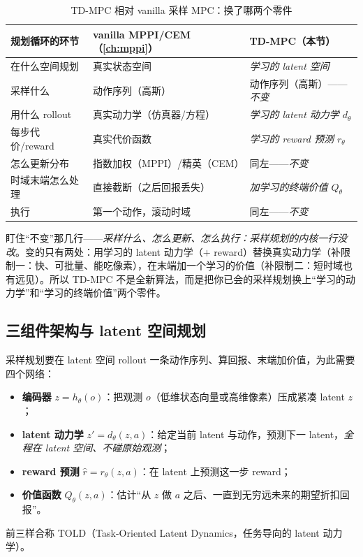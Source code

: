 \begin{table}[H]\centering\small
\caption{TD-MPC 相对 vanilla 采样 MPC：换了哪两个零件}
\label{tab:mv-twoparts}
\begin{tabular}{p{} p{} p{}}
\toprule
规划循环的环节 & vanilla MPPI/CEM（\cref{ch:mppi}） & TD-MPC（本节） \\
\midrule
在什么空间规划 & 真实状态空间 & \emph{学习的 latent 空间} \\
采样什么 & 动作序列（高斯） & 动作序列（高斯）——\emph{不变} \\
用什么 rollout & 真实动力学（仿真器/方程） & \emph{学习的 latent 动力学 $d_\theta$} \\
每步代价/reward & 真实代价函数 & \emph{学习的 reward 预测 $r_\theta$} \\
怎么更新分布 & 指数加权（MPPI）/精英（CEM） & 同左——\emph{不变} \\
时域末端怎么处理 & 直接截断（之后回报丢失） & \emph{加学习的终端价值 $Q_\theta$} \\
执行 & 第一个动作，滚动时域 & 同左——\emph{不变} \\
\bottomrule
\end{tabular}
\end{table}

\noindent 盯住“不变”那几行——\emph{采样什么、怎么更新、怎么执行：采样规划的内核一行没改}。变的只有两处：用学习的 latent 动力学（$+$ reward）替换真实动力学（补限制一：快、可批量、能吃像素），在末端加一个学习的价值（补限制二：短时域也有远见）。所以 TD-MPC 不是全新算法，而是把你已会的采样规划换上“学习的动力学”和“学习的终端价值”两个零件。

\subsection{三组件架构与 latent 空间规划}
\label{sec:mv-tdmpc-arch}

\begin{definition}\label{def:mv-worldmodel}
采样规划要在 latent 空间 rollout 一条动作序列、算回报、末端加价值，为此需要四个网络\cite{hansen2022tdmpc}：
\begin{itemize}
  \item \textbf{编码器} $z=h_\theta(o)$：把观测 $o$（低维状态向量或高维像素）压成紧凑 latent $z$；
  \item \textbf{latent 动力学} $z'=d_\theta(z,a)$：给定当前 latent 与动作，预测下一 latent，\emph{全程在 latent 空间、不碰原始观测}；
  \item \textbf{reward 预测} $\hat r=r_\theta(z,a)$：在 latent 上预测这一步 reward；
  \item \textbf{价值函数} $Q_\theta(z,a)$：估计“从 $z$ 做 $a$ 之后、一直到无穷远未来的期望折扣回报”。
\end{itemize}
前三样合称 TOLD（Task-Oriented Latent Dynamics，任务导向的 latent 动力学）。
\end{definition}

